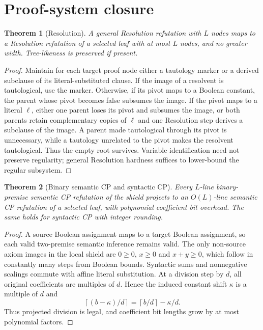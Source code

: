 \documentclass[11pt]{article}
\newtheorem{theorem}{Theorem}
\begin{document}
\section{Proof-system closure}
\begin{theorem}[Resolution]\label{res}
A general Resolution refutation with $L$ nodes maps to a Resolution
refutation of a selected leaf with at most $L$ nodes, and no greater width.
Tree-likeness is preserved if present.
\end{theorem}
\begin{proof}
Maintain for each target proof node either a tautology marker or a
derived subclause of its literal-substituted clause. If the image
of a resolvent is tautological, use the marker. Otherwise, if its
pivot maps to a Boolean constant, the parent whose pivot becomes
false subsumes the image. If the pivot maps to a literal $\ell$,
either one parent loses its pivot and subsumes the image, or both
parents retain complementary copies of $\ell$ and one Resolution
step derives a subclause of the image. A parent made tautological
through its pivot is unnecessary, while a tautology unrelated to
the pivot makes the resolvent tautological. Thus the empty
root survives. Variable identification need not preserve
regularity; general Resolution hardness suffices to lower-bound
the regular subsystem.
\end{proof}

\begin{theorem}[Binary semantic CP and syntactic CP]
Every $L$-line binary-premise semantic CP refutation of the shield
projects to an $O(L)$-line semantic CP refutation of a selected leaf,
with polynomial coefficient bit overhead. The same holds for
syntactic CP with integer rounding.
\end{theorem}
\begin{proof}
A source Boolean assignment maps to a target Boolean assignment,
so each valid two-premise semantic inference remains valid.
The only non-source axiom images in the local shield are
$0\ge0$, $x\ge0$ and $x+y\ge0$, which follow in constantly
many steps from Boolean bounds. Syntactic sums and nonnegative
scalings commute with affine literal substitution.
At a division step by $d$, all original coefficients are
multiples of $d$. Hence the induced constant shift $\kappa$
is a multiple of $d$ and
\[
\left\lceil (b-\kappa)/d\right\rceil
=\left\lceil b/d\right\rceil-\kappa/d.
\]
Thus projected division is legal, and coefficient bit lengths
grow by at most polynomial factors.
\end{proof}
\end{document}

